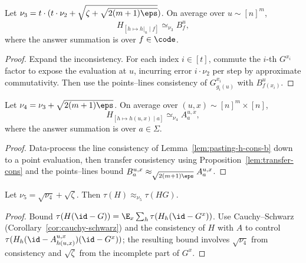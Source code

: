 \begin{lemma}\label{lem:pasting-h-cons-b}
  Let $\nu_3=t\cdot(t\cdot\nu_2+\sqrt{\zeta+\sqrt{2(m+1)\eps}})$.
  On average over $u\sim[n]^m$,
  \[
    H_{[h\mapsto h|_u\mid f]}\simeq_{\nu_3} B^u_f,
  \]
  where the answer summation is over $f\in\code$.
\end{lemma}
\begin{proof}
  Expand the inconsistency. For each index $i\in[t]$, commute the $i$-th
  $G^{x_i}$ factor to expose the evaluation at $u$, incurring error
  $i\cdot\nu_2$ per step by approximate commutativity. Then use the
  points--lines consistency of $G^{x_i}_{g_i(u)}$ with $B^u_{f(x_i)}$.
\end{proof}

\begin{lemma}\label{lem:pasting-h-cons-a}
  Let $\nu_4=\nu_3+\sqrt{2(m+1)\eps}$. On average over $(u,x)\sim[n]^m\times[n]$,
  \[
    H_{[h\mapsto h(u,x)\mid a]}\simeq_{\nu_4} A^{u,x}_a,
  \]
  where the answer summation is over $a\in\Sigma$.
\end{lemma}
\begin{proof}
  Data-process the line consistency of Lemma~\ref{lem:pasting-h-cons-b} down
  to a point evaluation, then transfer consistency using
  Proposition~\ref{lem:transfer-cons} and the points--lines bound
  $B^{u,x}_a\approx_{\sqrt{2(m+1)\eps}} A^{u,x}_a$.
\end{proof}

\begin{lemma}[$H$ close to $HG$]\label{lem:pasting-h-close-hg}
  Let $\nu_5=\sqrt{\nu_4}+\sqrt{\zeta}$. Then
  $\tau(H)\approx_{\nu_5}\tau(HG)$.
\end{lemma}
\begin{proof}
  Bound $\tau(H(\id-G))=\E_x\sum_h\tau(H_h(\id-G^x))$.
  Use Cauchy--Schwarz (Corollary~\ref{cor:cauchy-schwarz}) and the
  consistency of $H$ with $A$ to control $\tau(H_h(\id-A^{u,x}_{h(u,x)})(\id-G^x))$;
  the resulting bound involves $\sqrt{\nu_4}$ from consistency and
  $\sqrt\zeta$ from the incomplete part of $G^x$.
\end{proof}

